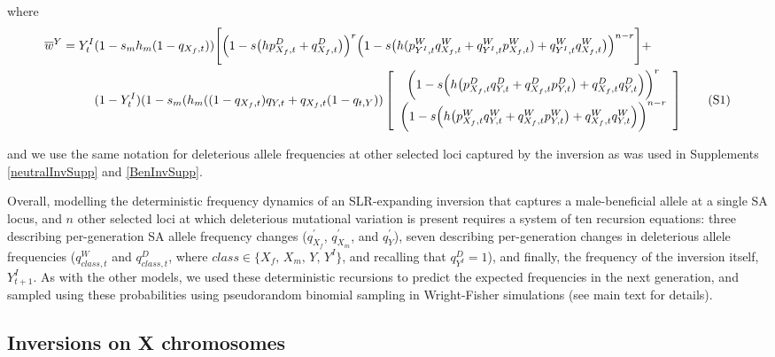 \documentclass{article}
\newcommand\numberthis{\addtocounter{equation}{1}\tag{\theequation}}
\begin{document}
\begin{appendices}
\noindent where 
\begin{align*}\label{eq:wBarY-SA-multiLoc}
	\overline{w}^Y = Y^I_t& (1 - s_m h_m (1 - q_{X_f,t})) \Bigg[ \Big(1 - s \big(h p^{D}_{X_f,t} + q^{D}_{X_f,t} \big) \Big)^{r}\Big(1 - s \big(h (p^{W}_{Y^I,t} q^{W}_{X_f,t} + q^{W}_{Y^I,t} p^{W}_{X_f,t}) + q^{W}_{Y^I,t} q^{W}_{X_f,t} \big) \Big)^{n-r} \Bigg] +\\
	&(1 - Y^I_t) (1 - s_m (h_m ((1 - q_{X_f,t}) q_{Y,t} + q_{X_f,t} (1 - q_{t,Y})) \left[\begin{array}{c}
											\bigg( 1 - s \Big( h \big( p^{D}_{X_f,t} q^{D}_{Y,t} +  q^{D}_{X_f,t} p^{D}_{Y,t} \big) + q^{D}_{X_f,t} q^{D}_{Y,t} \Big) \bigg)^r\\
											\bigg( 1 - s \Big( h \big( p^{W}_{X_f,t} q^{W}_{Y,t} +  q^{W}_{X_f,t} p^{W}_{Y,t} \big) + q^{W}_{X_f,t} q^{W}_{Y,t} \Big) \bigg)^{n-r}
											\end{array} \right] \numberthis
\end{align*}

\noindent and we use the same notation for deleterious allele frequencies at other selected loci captured by the inversion as was used in Supplements \ref{neutralInvSupp} and \ref{BenInvSupp}. 

Overall, modelling the deterministic frequency dynamics of an SLR-expanding inversion that captures a male-beneficial allele at a single SA locus, and $n$ other selected loci at which deleterious mutational variation is present requires a system of ten recursion equations: three describing per-generation SA allele frequency changes ($q^{\prime}_{X_f}$, $q^{\prime}_{X_m}$, and $q^{\prime}_{Y}$), seven describing per-generation changes in deleterious allele frequencies ($q^{W}_{class,t}$ and $q^{D}_{class,t}$, where $class \in \{X_f,\,X_m,\,Y,\,Y^I\}$, and recalling that $q^D_{Y^I} = 1$), and finally, the frequency of the inversion itself, $Y^I_{t+1}$. As with the other models, we used these deterministic recursions to predict the expected frequencies in the next generation, and sampled using these probabilities using pseudorandom binomial sampling in Wright-Fisher simulations (see main text for details).














\subsection{Inversions on X chromosomes} \label{subsec:SA-Xchrom}


\end{appendices}
\end{document}

